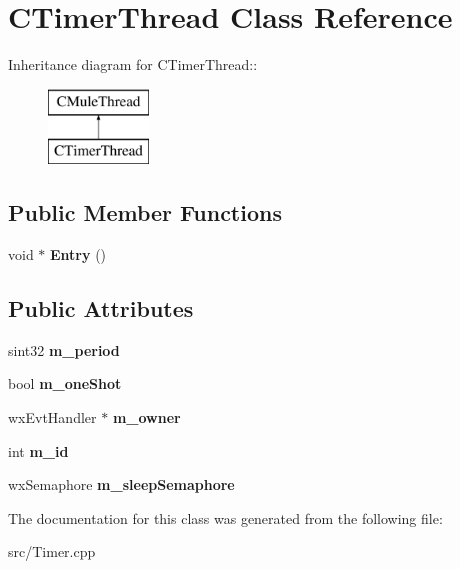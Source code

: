 \section{CTimerThread Class Reference}
\label{classCTimerThread}
Inheritance diagram for CTimerThread::\begin{figure}[H]
\begin{center}
\leavevmode
\includegraphics[height=2cm]{classCTimerThread}
\end{center}
\end{figure}
\subsection*{Public Member Functions}
\begin{DoxyCompactItemize}
\item 
void $\ast$ {\bfseries Entry} ()\label{classCTimerThread_a8f2daec82344e606405480839ddb5ca4}

\end{DoxyCompactItemize}
\subsection*{Public Attributes}
\begin{DoxyCompactItemize}
\item 
sint32 {\bfseries m\_\-period}\label{classCTimerThread_a295e1e91f6099316db188e278ffcf34f}

\item 
bool {\bfseries m\_\-oneShot}\label{classCTimerThread_a64b3041f9edebf7fc0e7fac9363c8fb7}

\item 
wxEvtHandler $\ast$ {\bfseries m\_\-owner}\label{classCTimerThread_a12c32a9a25ea726dbcf745083cb25474}

\item 
int {\bfseries m\_\-id}\label{classCTimerThread_a9e76eae7d7b1855f20b695738a464a62}

\item 
wxSemaphore {\bfseries m\_\-sleepSemaphore}\label{classCTimerThread_ac5af5c58cb68c5ad18ec43596454a177}

\end{DoxyCompactItemize}


The documentation for this class was generated from the following file:\begin{DoxyCompactItemize}
\item 
src/Timer.cpp\end{DoxyCompactItemize}
